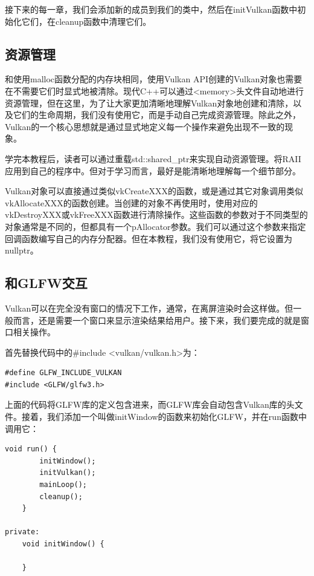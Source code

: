 \documentclass{ctexart}
\begin{document}
接下来的每一章，我们会添加新的成员到我们的类中，然后在initVulkan函数中初始化它们，在cleanup函数中清理它们。

\subsection{资源管理}

和使用malloc函数分配的内存块相同，使用Vulkan API创建的Vulkan对象也需要在不需要它们时显式地被清除。现代C++可以通过<memory>头文件自动地进行资源管理，但在这里，为了让大家更加清晰地理解Vulkan对象地创建和清除，以及它们的生命周期，我们没有使用它，而是手动自己完成资源管理。除此之外，Vulkan的一个核心思想就是通过显式地定义每一个操作来避免出现不一致的现象。

学完本教程后，读者可以通过重载std::shared\_ptr来实现自动资源管理。将RAII应用到自己的程序中。但对于学习而言，最好是能清晰地理解每一个细节部分。

Vulkan对象可以直接通过类似vkCreateXXX的函数，或是通过其它对象调用类似vkAllocateXXX的函数创建。当创建的对象不再使用时，使用对应的vkDestroyXXX或vkFreeXXX函数进行清除操作。这些函数的参数对于不同类型的对象通常是不同的，但都具有一个pAllocator参数。我们可以通过这个参数来指定回调函数编写自己的内存分配器。但在本教程，我们没有使用它，将它设置为nullptr。

\subsection{和GLFW交互}

Vulkan可以在完全没有窗口的情况下工作，通常，在离屏渲染时会这样做。但一般而言，还是需要一个窗口来显示渲染结果给用户。接下来，我们要完成的就是窗口相关操作。

首先替换代码中的\#include <vulkan/vulkan.h>为：

\begin{lstlisting}[language={[ANSI]C}]
#define GLFW_INCLUDE_VULKAN
#include <GLFW/glfw3.h>
\end{lstlisting}

上面的代码将GLFW库的定义包含进来，而GLFW库会自动包含Vulkan库的头文件。接着，我们添加一个叫做initWindow的函数来初始化GLFW，并在run函数中调用它：

\begin{lstlisting}[language={[ANSI]C}]
	void run() {
		initWindow();
		initVulkan();
		mainLoop();
		cleanup();
	}

private:
	void initWindow() {

	}
\end{lstlisting}
\end{document}
